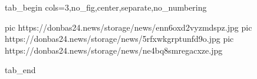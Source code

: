  
 
 
 
 

\ifcmt
  tab_begin cols=3,no_fig,center,separate,no_numbering

     pic https://donbas24.news/storage/news/enn6oxd2vyzmdspz.jpg
     pic https://donbas24.news/storage/news/5rfxwkgrptunfd9o.jpg
     pic https://donbas24.news/storage/news/ne4bq8smregacxze.jpg

  tab_end
\fi
